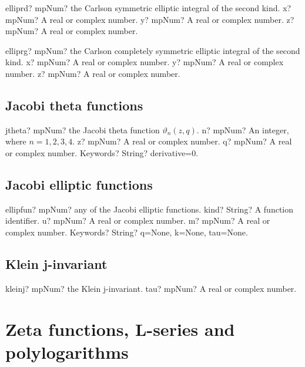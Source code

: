 \documentclass[12pt,a4paper,openany]{book}
\begin{document}
\begin{mpFunctionsExtract}
\mpFunctionThree
{elliprd? mpNum? the Carlson symmetric elliptic integral of the second kind.}
{x? mpNum? A real or complex number.}
{y? mpNum? A real or complex number.}
{z? mpNum? A real or complex number.}
\end{mpFunctionsExtract}

\begin{mpFunctionsExtract}
\mpFunctionThree
{elliprg? mpNum? the Carlson completely symmetric elliptic integral of the second kind.}
{x? mpNum? A real or complex number.}
{y? mpNum? A real or complex number.}
{z? mpNum? A real or complex number.}
\end{mpFunctionsExtract}

\section{Jacobi theta functions}

\begin{mpFunctionsExtract}
\mpFunctionFour
{jtheta? mpNum? the Jacobi theta function $\vartheta_n(z,q)$.}
{n? mpNum? An integer, where $n=1,2,3,4$.}
{z? mpNum? A real or complex number.}
{q? mpNum? A real or complex number.}
{Keywords? String? derivative=0.}
\end{mpFunctionsExtract}

\section{Jacobi elliptic functions}

\begin{mpFunctionsExtract}
\mpFunctionFour
{ellipfun? mpNum? any of the Jacobi elliptic functions.}
{kind? String? A function identifier.}
{u? mpNum? A real or complex number.}
{m? mpNum? A real or complex number.}
{Keywords? String?  q=None, k=None, tau=None.}
\end{mpFunctionsExtract}

\section{Klein j-invariant}

\begin{mpFunctionsExtract}
\mpFunctionOne
{kleinj? mpNum? the Klein j-invariant.}
{tau? mpNum? A real or complex number.}
\end{mpFunctionsExtract}

\chapter{Zeta functions, L-series and polylogarithms}
\end{document}
